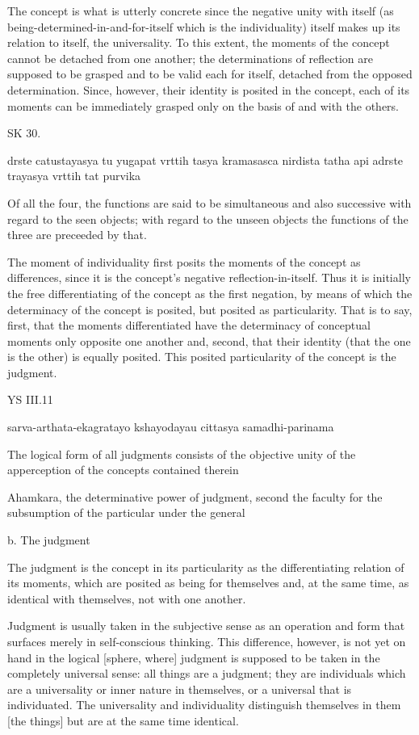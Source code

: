 The concept is what is utterly concrete since the negative unity with itself
(as being-determined-in-and-for-itself which is the individuality)
itself makes up its relation to itself, the universality.
To this extent, the moments of the concept cannot be detached from one another;
the determinations of reflection are supposed to be grasped
and to be valid each for itself,
detached from the opposed determination.
Since, however, their identity is posited in the concept,
each of its moments can be immediately grasped only
on the basis of and with the others.

SK 30.

drste catustayasya tu yugapat vrttih tasya kramasasca nirdista
tatha api adrste trayasya vrttih tat purvika

Of all the four, the functions are said to be simultaneous and also successive
with regard to the seen objects; with regard to the unseen objects
the functions of the three are preceeded by that.

The moment of individuality first posits the moments of the concept as differences,
since it is the concept's negative reflection-in-itself.
Thus it is initially the free differentiating of the concept as the first negation,
by means of which the determinacy of the concept is posited, but posited as particularity.
That is to say, first, that the moments differentiated have
the determinacy of conceptual moments only opposite one another and,
second, that their identity (that the one is the other) is equally posited.
This posited particularity of the concept is the judgment.

YS III.11

sarva-arthata-ekagratayo kshayodayau cittasya samadhi-parinama

The logical form of all judgments consists of the objective unity
of the apperception of the concepts contained therein

Ahamkara, the determinative power of judgment,
second the faculty for the subsumption of the particular under the general

b. The judgment

The judgment is the concept in its particularity as the differentiating
relation of its moments, which are posited as being for themselves and,
at the same time, as identical with themselves, not with one another.

Judgment is usually taken in the subjective sense as an operation and form
that surfaces merely in self-conscious thinking.
This difference, however, is not yet on hand in the logical [sphere, where]
judgment is supposed to be taken in the completely universal sense:
all things are a judgment;
they are individuals which are a universality or inner nature in themselves,
or a universal that is individuated. The universality and individuality
distinguish themselves in them [the things] but are at the same time identical.

